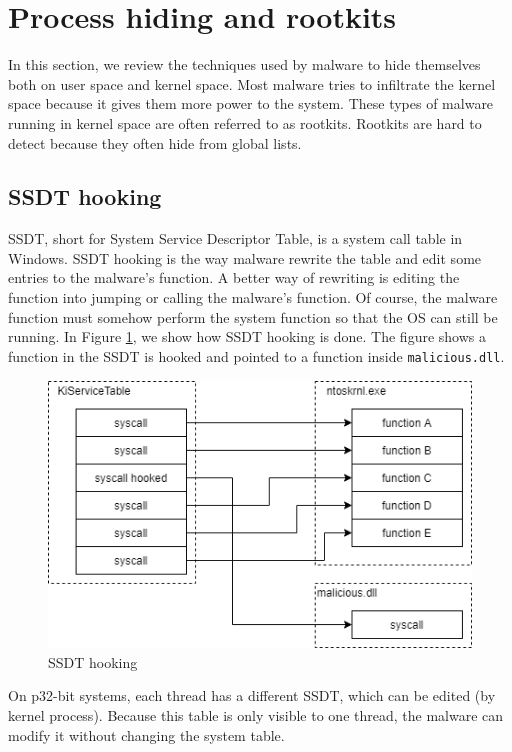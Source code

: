 \section[Process hiding]{Process hiding and rootkits}

In this section, we review the techniques used by malware to hide themselves
both on user space and kernel space. Most malware tries to infiltrate the
kernel space because it gives them more power to the system. These types of
malware running in kernel space are often referred to as rootkits. Rootkits are
hard to detect because they often hide from global lists.

\subsection[SSDT hooking]{SSDT hooking}

SSDT, short for System Service Descriptor Table, is a system call table in
Windows. SSDT hooking is the way malware rewrite the table and edit some
entries to the malware's function. A better way of rewriting is editing the
function into jumping or calling the malware's function. Of course, the malware
function must somehow perform the system function so that the OS can still be
running. In Figure \ref{fig:ssdt}, we show how SSDT hooking is done. The figure
shows a function in the SSDT is hooked and pointed to a function inside
\texttt{malicious.dll}.

\begin{figure}[h]
  \centering
  \caption{SSDT hooking}
  \label{fig:ssdt}
  \includegraphics[scale=1]{images/ssdt.png}
\end{figure}

On p32-bit systems, each thread has a different SSDT, which can be edited (by
kernel process). Because this table is only visible to one thread, the malware
can modify it without changing the system table.

